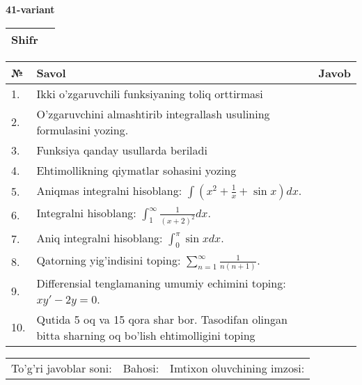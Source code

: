 \documentclass{article}
\begin{document}
  \egroup
  
  \newpage
  
  
  \textbf{41-variant}\\
  
  \bgroup
  \def\arraystretch{1.6} %
  
  \begin{tabular}{|m{5.7cm}|m{9.5cm}|}
  \hline
  Shifr & \\
  \hline
  \end{tabular}
  
  \vspace{1cm}
  
  \begin{tabular}{|m{0.7cm}|m{10cm}|m{4cm}|}
  \hline
  № & Savol & Javob \\
  \hline
  1. & Ikki o'zgaruvchili funksiyaning toliq orttirmasi &  \\
  \hline
  2. & O'zgaruvchini almashtirib integrallash usulining formulasini yozing. &  \\
  \hline
  3. & Funksiya qanday usullarda beriladi &  \\
  \hline
  4. & Ehtimollikning qiymatlar sohasini yozing &  \\
  \hline
  5. & Aniqmas integralni hisoblang: \(\int {\left( x^{2} + \frac{1}{x} + \sin x \right)dx}\). &  \\
  \hline
  6. & Integralni hisoblang: \(\int_{1}^{\infty}{\frac{1}{(x + 2)^{2}}dx}\). &  \\
  \hline
  7. & Aniq integralni hisoblang: \(\int_{0}^{\pi}{\sin xdx}\). &  \\
  \hline
  8. & Qatorning yig'indisini toping: \(\sum_{n = 1}^{\infty}\frac{1}{n(n + 1)}\). &  \\
  \hline
  9. & Differensial tenglamaning umumiy echimini toping: \(xy' - 2y = 0\). &  \\
  \hline
  10. & Qutida 5 oq va 15 qora shar bor. Tasodifan olingan bitta sharning oq bo'lish ehtimolligini toping &  \\
  \hline
  \end{tabular}
  
  \vspace{1cm}
  
  \begin{tabular}{lll}
  To'g'ri javoblar soni: \underline{\hspace{1.5cm}} & 
  Bahosi: \underline{\hspace{1.5cm}} & 
  Imtixon oluvchining imzosi: \underline{\hspace{2cm}} \\
  \end{tabular}
  
\end{document}
